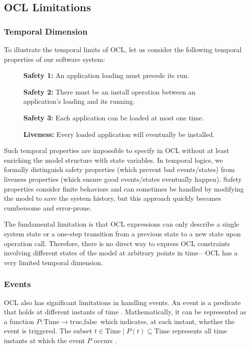 \subsection{OCL Limitations}

\subsubsection{Temporal Dimension}
\hspace{1cm} To illustrate the temporal limits of OCL, let us consider the following temporal 
properties of our software system: 

\begin{figure}
    \begin{mdframed}
        \item \textbf{Safety 1:} An application loading must precede its run.
        \item \textbf{Safety 2:} There must be an install operation between an application's loading and its running.
        \item \textbf{Safety 3:} Each application can be loaded at most one time.
        \item \textbf{Liveness:} Every loaded application will eventually be installed.
    \end{mdframed}        
    \label{fig:temporal_properties}
\end{figure}

Such temporal properties are impossible to specify in OCL without at least enriching 
the model structure with state variables. In temporal logics, we formally distinguish 
safety properties (which prevent bad events/states) from liveness properties (which 
ensure good events/states eventually happen). Safety properties consider finite 
behaviors and can sometimes be handled by modifying the model to save the system 
history, but this approach quickly becomes cumbersome and error-prone.

The fundamental limitation is that OCL expressions can only describe a single system 
state or a one-step transition from a previous state to a new state upon operation 
call. Therefore, there is no direct way to express OCL constraints involving different 
states of the model at arbitrary points in time—OCL has a very limited temporal 
dimension.

\subsubsection{Events}
\hspace{1cm} OCL also has significant limitations in handling events. An event is a predicate that 
holds at different instants of time . Mathematically, it can be represented as a 
function 
$P : \text{Time} \rightarrow {\text{true}, \text{false}}$ 
which indicates, at each instant, whether the event is triggered. The subset 
${t \in \text{Time} \mid P(t)} \subseteq \text{Time}$ 
represents all time instants at which the event $P$ occurs \cite{TOCL_Taha}.

